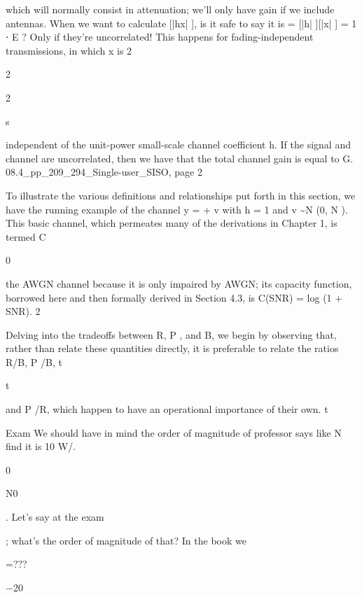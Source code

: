 {{{{{which will normally consist in attenuation; we'll only have gain if we include antennas.
When we want to calculate [|hx| ], is it safe to say it is = [|h| ][|x| ] = 1 ⋅ E ? Only if they're uncorrelated! This happens for fading-independent transmissions, in which x is 2

2

2

s

independent of the unit-power small-scale channel coefficient h.
If the signal and channel are uncorrelated, then we have that the total channel gain is equal to G.
08.4_pp_209_294_Single-user_SISO, page 2

To illustrate the various definitions and relationships put forth in this section, we have the running example of the channel y = \sqrtGhx + v with h = 1 and v \sim N (0, N ).
This basic channel, which permeates many of the derivations in Chapter 1, is termed C

0

the AWGN channel because it is only impaired by AWGN; its capacity function,
borrowed here and then formally derived in Section 4.3, is C(SNR) = log (1 + SNR).
2

Delving into the tradeoffs between R, P , and B, we begin by observing that, rather than relate these quantities directly, it is preferable to relate the ratios R/B, P /B,
t

t

and P /R, which happen to have an operational importance of their own.
t

Exam We should have in mind the order of magnitude of professor says like N find it is 10 W/\sqrtHz.

0

N0

. Let's say at the exam

; what's the order of magnitude of that? In the book we

=???

−20

}}}}}
